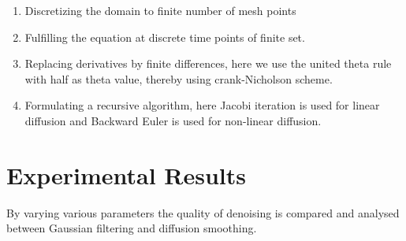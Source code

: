 \documentclass{ipol}
\begin{document}
\begin{enumerate}
 \item Discretizing the domain to finite number of mesh points
\item Fulfilling the equation at discrete time points of finite set.
\item Replacing derivatives by finite differences, here we use the united theta rule with half as theta value, thereby using crank-Nicholson scheme.
\item Formulating a recursive algorithm, here Jacobi iteration is used for linear diffusion and Backward Euler is used for non-linear diffusion.
 \end{enumerate}




\section{Experimental Results}
By varying various parameters the quality of denoising is compared and analysed between Gaussian filtering and diffusion smoothing.
\end{document}
